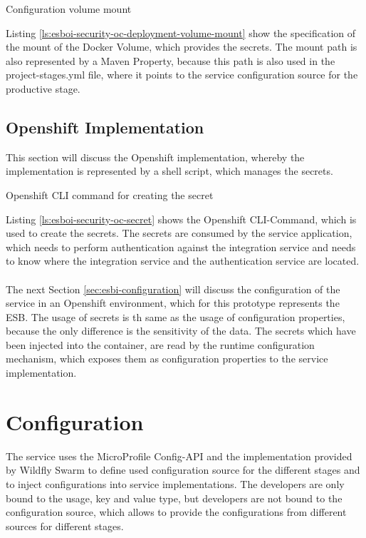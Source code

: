 \begin{listing}
	\caption{Configuration volume mount}
	\label{ls:esboi-security-oc-deployment-volume-mount}
\end{listing}

Listing \vref{ls:esboi-security-oc-deployment-volume-mount} show the specification of the mount of the Docker Volume, which provides the secrets. The mount path is also represented by a Maven Property, because this path is also used in the project-stages.yml file, where it points to the service configuration source for the productive stage. 

\subsection{Openshift Implementation}
\label{sec:esbi-security-openshift}
This section will discuss the Openshift implementation, whereby the implementation is represented by a shell script, which manages the secrets. 

\begin{listing}
	\caption{Openshift CLI command for creating the secret}
	\label{ls:esboi-security-oc-secret}
\end{listing}

Listing \vref{ls:esboi-security-oc-secret} shows the Openshift CLI-Command, which is used to create the secrets. The secrets are consumed by the service application, which needs to perform authentication against the integration service and needs to know where the integration service and the authentication service are located. 
\\ \\
The next Section \vref{sec:esbi-configuration} will discuss the configuration of the service in an Openshift environment, which for this prototype represents the ESB. The usage of secrets is th same as the usage of configuration properties, because the only difference is the sensitivity of the data. The secrets which have been injected into the container, are read by the runtime configuration mechanism, which exposes them as configuration properties to the service implementation.

\newpage

\section{Configuration}
\label{sec:esbi-configuration}
The service uses the MicroProfile Config-API and the implementation provided by Wildfly Swarm to define used configuration source for the different stages and to inject configurations into service implementations. The developers are only bound to the usage, key and value type, but developers are not bound to the configuration source, which allows to provide the configurations from different sources for different stages. 

